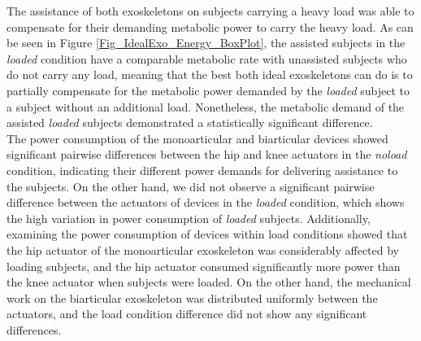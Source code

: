\documentclass[10pt,letterpaper]{article}
\begin{document}
The assistance of both exoskeletons on subjects carrying a heavy load was able to compensate for their demanding metabolic power to carry the heavy load. As can be seen in Figure \ref{Fig_IdealExo_Energy_BoxPlot}, the assisted subjects in the \textit{loaded} condition have a comparable metabolic rate with unassisted subjects who do not carry any load, meaning that the best both ideal exoskeletons can do is to partially compensate for the metabolic power demanded by the \textit{loaded} subject to a subject without an additional load. Nonetheless, the metabolic demand of the assisted \textit{loaded} subjects demonstrated a statistically significant difference.\\
The power consumption of the monoarticular and biarticular devices showed significant pairwise differences between the hip and knee actuators in the {\it noload} condition, indicating their different power demands for delivering assistance to the subjects. On the other hand, we did not observe a significant pairwise difference between the actuators of devices in the {\it loaded} condition, which shows the high variation in power consumption of {\it loaded} subjects.
Additionally, examining the power consumption of devices within load conditions showed that the hip actuator of the monoarticular exoskeleton was considerably affected by loading subjects, and the hip actuator consumed significantly more power than the knee actuator when subjects were loaded. On the other hand, the mechanical work on the biarticular exoskeleton was distributed uniformly between the actuators, and the load condition difference did not show any significant differences.\\
\end{document}
